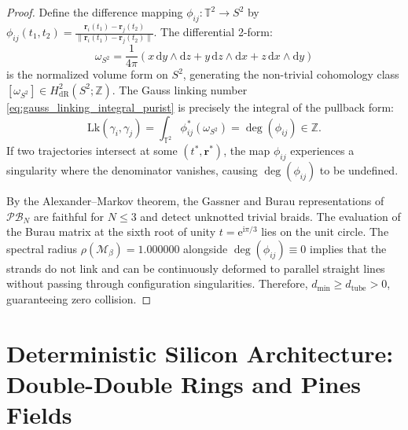 \documentclass[11pt,a4paper,reqno]{article}
\theoremstyle{plain}
\theoremstyle{definition}
\theoremstyle{remark}
\numberwithin{equation}{section}
\newcommand{\Z}{\mathbb{Z}}
\begin{document}
\begin{proof}
Define the difference mapping $\phi_{ij} : \mathbb{T}^2 \to S^2$ by $\phi_{ij}(t_1, t_2) = \frac{\mathbf{r}_i(t_1) - \mathbf{r}_j(t_2)}{\|\mathbf{r}_i(t_1) - \mathbf{r}_j(t_2)\|}$. The differential 2-form:
\begin{equation}
  \omega_{S^2} = \frac{1}{4\pi} \left( x\,\mathrm{d}y \wedge \mathrm{d}z + y\,\mathrm{d}z \wedge \mathrm{d}x + z\,\mathrm{d}x \wedge \mathrm{d}y \right)
\end{equation}
is the normalized volume form on $S^2$, generating the non-trivial cohomology class $[\omega_{S^2}] \in H_{\mathrm{dR}}^2(S^2; \Z)$. The Gauss linking number \eqref{eq:gauss_linking_integral_purist} is precisely the integral of the pullback form:
\begin{equation}
  \mathrm{Lk}(\gamma_i, \gamma_j) = \int_{\mathbb{T}^2} \phi_{ij}^*(\omega_{S^2}) = \operatorname{deg}(\phi_{ij}) \in \Z.
\end{equation}
If two trajectories intersect at some $(t^*, \mathbf{r}^*)$, the map $\phi_{ij}$ experiences a singularity where the denominator vanishes, causing $\operatorname{deg}(\phi_{ij})$ to be undefined. 

By the Alexander--Markov theorem, the Gassner and Burau representations of $\mathcal{P}\mathcal{B}_N$ are faithful for $N \le 3$ and detect unknotted trivial braids. The evaluation of the Burau matrix at the sixth root of unity $t = \mathrm{e}^{\mathrm{i}\pi/3}$ lies on the unit circle. The spectral radius $\rho(\mathcal{M}_\beta) = 1.000000$ alongside $\operatorname{deg}(\phi_{ij}) \equiv 0$ implies that the strands do not link and can be continuously deformed to parallel straight lines without passing through configuration singularities. Therefore, $d_{\min} \ge d_{\mathrm{tube}} > 0$, guaranteeing zero collision.
\end{proof}

\section{Deterministic Silicon Architecture: Double-Double Rings and Pines Fields}
\label{sec:silicon_architecture}
\end{document}
